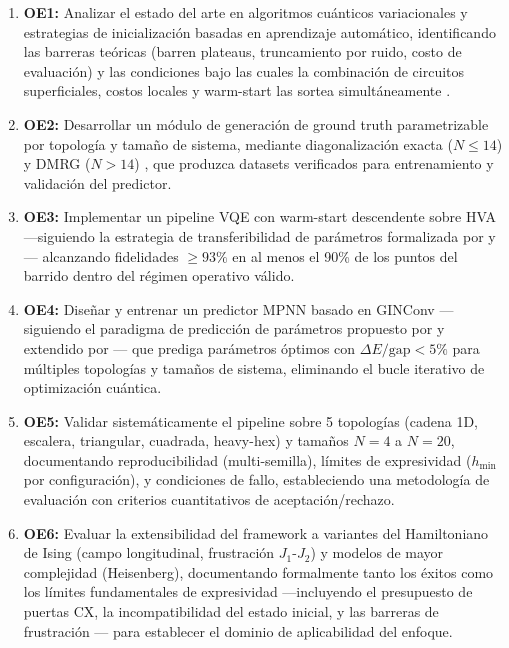 \documentclass[11pt,a4paper,spanish]{book}
\begin{document}
\begin{enumerate}
    \item \textbf{OE1:} Analizar el estado del arte en algoritmos cuánticos variacionales y estrategias de inicialización basadas en aprendizaje automático, identificando las barreras teóricas (barren plateaus, truncamiento por ruido, costo de evaluación) y las condiciones bajo las cuales la combinación de circuitos superficiales, costos locales y warm-start las sortea simultáneamente \citep{mele2026, cerezo2021, wiersema2020}.

    \item \textbf{OE2:} Desarrollar un módulo de generación de ground truth parametrizable por topología y tamaño de sistema, mediante diagonalización exacta ($N \leq 14$) y DMRG ($N > 14$) \citep{hauschild2018}, que produzca datasets verificados para entrenamiento y validación del predictor.

    \item \textbf{OE3:} Implementar un pipeline VQE con warm-start descendente sobre HVA ---siguiendo la estrategia de transferibilidad de parámetros formalizada por \citet{mele2022} y \citet{puig2025}--- alcanzando fidelidades $\geq 93\%$ en al menos el 90\% de los puntos del barrido dentro del régimen operativo válido.

    \item \textbf{OE4:} Diseñar y entrenar un predictor MPNN basado en GINConv \citep{xu2019} ---siguiendo el paradigma de predicción de parámetros propuesto por \citet{miao2024} y extendido por \citet{zhang2025}--- que prediga parámetros óptimos con $\Delta E/\text{gap} < 5\%$ para múltiples topologías y tamaños de sistema, eliminando el bucle iterativo de optimización cuántica.

    \item \textbf{OE5:} Validar sistemáticamente el pipeline sobre 5 topologías (cadena 1D, escalera, triangular, cuadrada, heavy-hex) y tamaños $N = 4$ a $N = 20$, documentando reproducibilidad (multi-semilla), límites de expresividad ($h_{\min}$ por configuración), y condiciones de fallo, estableciendo una metodología de evaluación con criterios cuantitativos de aceptación/rechazo.

    \item \textbf{OE6:} Evaluar la extensibilidad del framework a variantes del Hamiltoniano de Ising (campo longitudinal, frustración $J_1$-$J_2$) y modelos de mayor complejidad (Heisenberg), documentando formalmente tanto los éxitos como los límites fundamentales de expresividad ---incluyendo el presupuesto de puertas CX, la incompatibilidad del estado inicial, y las barreras de frustración \citep{huang2026frustration}--- para establecer el dominio de aplicabilidad del enfoque.
\end{enumerate}
\end{document}
